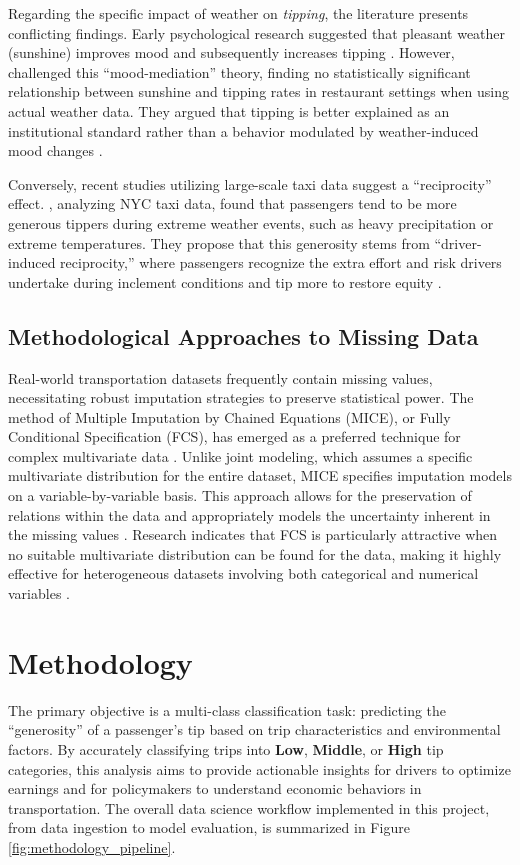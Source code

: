 \documentclass[11pt]{article}
\begin{document}
Regarding the specific impact of weather on \textit{tipping}, the literature presents conflicting findings. Early psychological research suggested that pleasant weather (sunshine) improves mood and subsequently increases tipping \citep{flynn2012weather}. However, \citet{flynn2012weather} challenged this ``mood-mediation'' theory, finding no statistically significant relationship between sunshine and tipping rates in restaurant settings when using actual weather data. They argued that tipping is better explained as an institutional standard rather than a behavior modulated by weather-induced mood changes \citep{flynn2012weather}.

Conversely, recent studies utilizing large-scale taxi data suggest a ``reciprocity'' effect. \citet{LEE2020101458}, analyzing NYC taxi data, found that passengers tend to be more generous tippers during extreme weather events, such as heavy precipitation or extreme temperatures. They propose that this generosity stems from ``driver-induced reciprocity,'' where passengers recognize the extra effort and risk drivers undertake during inclement conditions and tip more to restore equity \citep{LEE2020101458}.

\subsection{Methodological Approaches to Missing Data}
Real-world transportation datasets frequently contain missing values, necessitating robust imputation strategies to preserve statistical power. The method of Multiple Imputation by Chained Equations (MICE), or Fully Conditional Specification (FCS), has emerged as a preferred technique for complex multivariate data \citep{JSSv045i03}. Unlike joint modeling, which assumes a specific multivariate distribution for the entire dataset, MICE specifies imputation models on a variable-by-variable basis. This approach allows for the preservation of relations within the data and appropriately models the uncertainty inherent in the missing values \citep{JSSv045i03}. Research indicates that FCS is particularly attractive when no suitable multivariate distribution can be found for the data, making it highly effective for heterogeneous datasets involving both categorical and numerical variables \citep{JSSv045i03}.

\section{Methodology}
The primary objective is a multi-class classification task: predicting the ``generosity'' of a passenger's tip based on trip characteristics and environmental factors. By accurately classifying trips into \textbf{Low}, \textbf{Middle}, or \textbf{High} tip categories, this analysis aims to provide actionable insights for drivers to optimize earnings and for policymakers to understand economic behaviors in transportation. The overall data science workflow implemented in this project, from data ingestion to model evaluation, is summarized in Figure \ref{fig:methodology_pipeline}.
\end{document}
